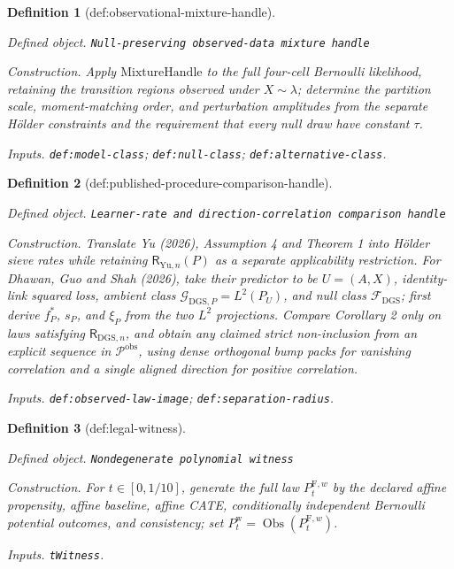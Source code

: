 \documentclass{article}
\newtheorem{definition}{Definition}
\begin{document}
\begin{definition}[def:observational-mixture-handle]\label{def:observational-mixture-handle}
\par\smallskip\noindent\emph{Defined object.} \texttt{Null-\allowbreak{}preserving observed-\allowbreak{}data mixture handle}
\par\smallskip\noindent\emph{Construction.} Apply \(\mathrm{MixtureHandle}\) to the full four-cell Bernoulli likelihood, retaining the transition regions observed under \(X\sim\lambda\); determine the partition scale, moment-matching order, and perturbation amplitudes from the separate Hölder constraints and the requirement that every null draw have constant \(\tau\).
\par\smallskip\noindent\emph{Inputs.} \texttt{def:\allowbreak{}model-\allowbreak{}class}; \texttt{def:\allowbreak{}null-\allowbreak{}class}; \texttt{def:\allowbreak{}alternative-\allowbreak{}class}.
\end{definition}

\begin{definition}[def:published-procedure-comparison-handle]\label{def:published-procedure-comparison-handle}
\par\smallskip\noindent\emph{Defined object.} \texttt{Learner-\allowbreak{}rate and direction-\allowbreak{}correlation comparison handle}
\par\smallskip\noindent\emph{Construction.} Translate Yu (2026), Assumption 4 and Theorem 1 into Hölder sieve rates while retaining \(\mathsf R_{\mathrm{Yu},n}(P)\) as a separate applicability restriction. For Dhawan, Guo and Shah (2026), take their predictor to be \(U=(A,X)\), identity-link squared loss, ambient class \(\mathcal G_{\mathrm{DGS},P}=L^2(P_U)\), and null class \(\mathcal F_{\mathrm{DGS}}\); first derive \(f_P^*\), \(s_P\), and \(\xi_P\) from the two \(L^2\) projections. Compare Corollary 2 only on laws satisfying \(\mathsf R_{\mathrm{DGS},n}\), and obtain any claimed strict non-inclusion from an explicit sequence in \(\mathcal P^{\mathrm{obs}}\), using dense orthogonal bump packs for vanishing correlation and a single aligned direction for positive correlation.
\par\smallskip\noindent\emph{Inputs.} \texttt{def:\allowbreak{}observed-\allowbreak{}law-\allowbreak{}image}; \texttt{def:\allowbreak{}separation-\allowbreak{}radius}.
\end{definition}

\begin{definition}[def:legal-witness]\label{def:legal-witness}
\par\smallskip\noindent\emph{Defined object.} \texttt{Nondegenerate polynomial witness}
\par\smallskip\noindent\emph{Construction.} For \(t\in[0,1/10]\), generate the full law \(P_t^{\mathrm F,w}\) by the declared affine propensity, affine baseline, affine CATE, conditionally independent Bernoulli potential outcomes, and consistency; set \(P_t^{\mathrm w}=\operatorname{Obs}(P_t^{\mathrm F,w})\).
\par\smallskip\noindent\emph{Inputs.} \texttt{tWitness}.
\end{definition}
\end{document}

